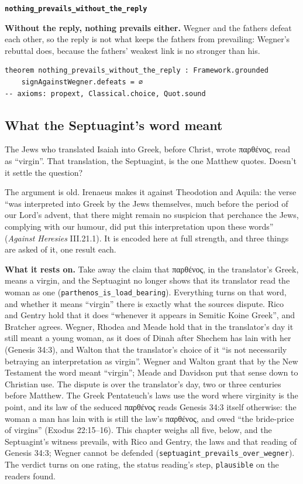 \documentclass[11pt]{article}
\begin{document}
\par\medskip\noindent\textbf{\texttt{nothing\_\allowbreak{}prevails\_\allowbreak{}without\_\allowbreak{}the\_\allowbreak{}reply}}\par\nobreak\noindent
\textbf{Without the reply, nothing prevails either.} Wegner and the fathers defeat each other, so the reply is not what keeps the fathers from prevailing: Wegner’s rebuttal does, because the fathers’ weakest link is no stronger than his.

{\small\begin{verbatim}
theorem nothing_prevails_without_the_reply : Framework.grounded
    signAgainstWegner.defeats = ∅
-- axioms: propext, Classical.choice, Quot.sound
\end{verbatim}}
\subsection*{What the Septuagint’s word meant}
The Jews who translated Isaiah into Greek, before Christ, wrote παρθένος, read as “virgin”. That translation, the Septuagint, is the one Matthew quotes. Doesn’t it settle the question?

The argument is old. Irenaeus makes it against Theodotion and Aquila: the verse “was interpreted into Greek by the Jews themselves, much before the period of our Lord’s advent, that there might remain no suspicion that perchance the Jews, complying with our humour, did put this interpretation upon these words” (\emph{Against Heresies} III.21.1). It is encoded here at full strength, and three things are asked of it, one result each.

\textbf{What it rests on.} Take away the claim that παρθένος, in the translator’s Greek, means a virgin, and the Septuagint no longer shows that its translator read the woman as one (\texttt{parthenos\_\allowbreak{}is\_\allowbreak{}load\_\allowbreak{}bearing}). Everything turns on that word, and whether it means “virgin” there is exactly what the sources dispute. Rico and Gentry hold that it does “whenever it appears in Semitic Koine Greek”, and Bratcher agrees. Wegner, Rhodea and Meade hold that in the translator’s day it still meant a young woman, as it does of Dinah after Shechem has lain with her (Genesis 34:3), and Walton that the translator’s choice of it “is not necessarily betraying an interpretation as virgin”. Wegner and Walton grant that by the New Testament the word meant “virgin”; Meade and Davidson put that sense down to Christian use. The dispute is over the translator’s day, two or three centuries before Matthew. The Greek Pentateuch’s laws use the word where virginity is the point, and its law of the seduced παρθένος reads Genesis 34:3 itself otherwise: the woman a man has lain with is still the law’s παρθένος, and owed “the bride-price of virgins” (Exodus 22:15–16). This chapter weighs all five, below, and the Septuagint’s witness prevails, with Rico and Gentry, the laws and that reading of Genesis 34:3; Wegner cannot be defended (\texttt{septuagint\_\allowbreak{}prevails\_\allowbreak{}over\_\allowbreak{}wegner}). The verdict turns on one rating, the status reading’s step, \texttt{plausible} on the readers found.
\end{document}
